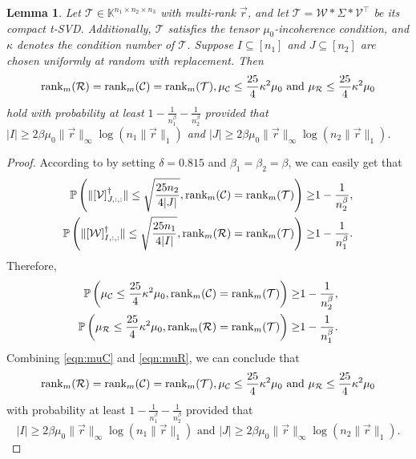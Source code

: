 \documentclass[twoside,12pt]{article}
\newtheorem{lemma}{Lemma}
\def\rank{\textnormal{rank}}
\def\rank{\textnormal{rank}}
\begin{document}
\begin{lemma} \label{lmm:incoherence-unf}  Let  $\mathcal{T}\in\mathbb{K}^{n_1\times n_2 \times n_3}$ with  multi-rank $\vec{r}$,   and let   $\mathcal{T}=\mathcal{W}*\Sigma*\mathcal{V}^{\top}$ be its compact t-SVD. Additionally,  $\mathcal{T}$ satisfies the tensor $\mu_0$-incoherence condition,   and $\kappa$ denotes the condition number of $\mathcal{T}$. Suppose $I\subseteq[n_1]$ and $J\subseteq[n_2]$ are chosen uniformly at random with replacement. Then \[\rank_m(\mathcal{R})=\rank_m(\mathcal{C})=\rank_m(\mathcal{T}), 
\mu_{\mathcal{C}}\leq \frac{25}{4}\kappa^2 \mu_0 \text{ and } 
 \mu_{\mathcal{R}}\leq \frac{25}{4}\kappa^2 \mu_0\]
 hold with probability at least $1-\frac{1}{n_1^{\beta}}-\frac{1}{n_2^{\beta}}$ 
provided that  $|I|\geq 2\beta \mu_0 \|\vec{r}\|_{\infty} \log \left(n_1\|\vec{r}\|_{1}\right)$ and  $|J|\geq 2\beta \mu_0 \|\vec{r}\|_{\infty} \log \left(n_2\|\vec{r}\|_{1}\right)$.
\end{lemma}
\begin{proof}
According to    by setting $\delta=0.815$ and $\beta_1=\beta_2=\beta$, we can easily get that 
\begin{align*}
    \mathbb{P}\left(\|[\mathcal{V}]_{J,:,:}^\dagger\|\leq \sqrt{\frac{25n_2}{4|J|}},\rank_m(\mathcal{C})=\rank_m(\mathcal{T})\right)\geq& 1-\frac{1}{n_2^\beta},\\
     \mathbb{P}\left(\|[\mathcal{W}]_{I,:,:}^\dagger\|\leq \sqrt{\frac{25n_1}{4|I|}},\rank_m(\mathcal{R})=\rank_m(\mathcal{T})\right)\geq& 1-\frac{1}{n_1^\beta}.
\end{align*}
 Therefore, 
 \begin{align}
    \mathbb{P}\left(\mu_{\mathcal{C}}\leq \frac{25}{4}\kappa^2 \mu_0,\rank_m(\mathcal{C})=\rank_m(\mathcal{T})\right)\geq& 1-\frac{1}{n_2^\beta}, \label{eqn:muC}\\
     \mathbb{P}\left(\mu_{\mathcal{R}}\leq \frac{25}{4}\kappa^2 \mu_0,\rank_m(\mathcal{R})=\rank_m(\mathcal{T})\right)\geq& 1-\frac{1}{n_1^\beta}\label{eqn:muR}.
\end{align}
Combining \eqref{eqn:muC} and \eqref{eqn:muR}, we can conclude that \[\rank_m(\mathcal{R})=\rank_m(\mathcal{C})=\rank_m(\mathcal{T}), 
\mu_{\mathcal{C}}\leq \frac{25}{4}\kappa^2 \mu_0 \text{ and } 
 \mu_{\mathcal{R}}\leq \frac{25}{4}\kappa^2 \mu_0\] 
 with probability at least $1-\frac{1}{n_1^{\beta}}-\frac{1}{n_2^{\beta}}$ 
provided that  \[|I|\geq 2\beta \mu_0 \|\vec{r}\|_{\infty} \log \left(n_1\|\vec{r}\|_{1}\right) \text{ and }   |J|\geq 2\beta \mu_0 \|\vec{r}\|_{\infty} \log \left(n_2\|\vec{r}\|_{1}\right).\]
\end{proof}
\end{document}
